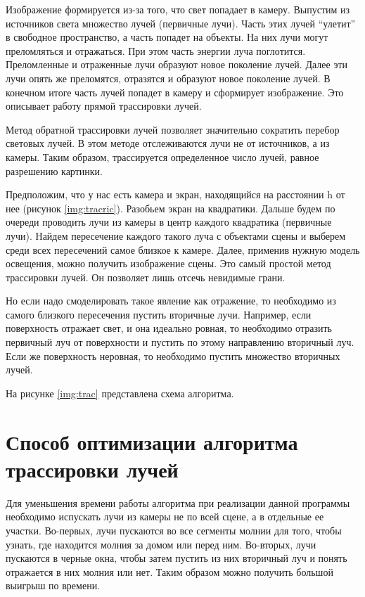 Изображение формируется из-за того, что свет попадает в камеру. Выпустим из источников света множество лучей (первичные лучи). Часть этих лучей “улетит” в свободное пространство, а часть попадет на объекты. На них лучи могут преломляться и отражаться. При этом часть энергии луча поглотится. Преломленные и отраженные лучи образуют новое поколение лучей. Далее эти лучи опять же преломятся, отразятся и образуют новое поколение лучей. В конечном итоге часть лучей попадет в камеру и сформирует изображение. Это описывает работу прямой трассировки лучей.

Метод обратной трассировки лучей позволяет значительно сократить перебор световых лучей. В этом методе отслеживаются лучи не от источников, а из камеры. Таким образом, трассируется определенное число лучей, равное разрешению картинки. 

 
Предположим, что у нас есть камера и экран, находящийся на расстоянии h от нее (рисунок \ref{img:tracric}). Разобьем экран на квадратики. Дальше будем по очереди проводить лучи из камеры в центр каждого квадратика (первичные лучи). Найдем пересечение каждого такого луча с объектами сцены и выберем среди всех пересечений самое близкое к камере. Далее, применив нужную модель освещения, можно получить изображение сцены. Это самый простой метод трассировки лучей. Он позволяет лишь отсечь невидимые грани.


Но если надо смоделировать такое явление как отражение, то необходимо из самого близкого пересечения пустить вторичные лучи. Например, если поверхность отражает свет, и она идеально ровная, то необходимо отразить первичный луч от поверхности и пустить по этому направлению вторичный луч. Если же поверхность неровная, то необходимо пустить множество вторичных лучей. 

На рисунке \ref{img:trac} представлена схема алгоритма.


\clearpage

\section{Способ оптимизации алгоритма трассировки лучей}
Для уменьшения времени работы алгоритма при реализации данной программы необходимо испускать лучи из камеры не по всей сцене, а в отдельные ее участки. Во-первых, лучи пускаются во все сегменты молнии для того, чтобы узнать, где находится молния за домом или перед ним. Во-вторых, лучи пускаются в черные окна, чтобы затем пустить из них вторичный луч и понять отражается в них молния или нет. Таким образом можно получить большой выигрыш по времени.

